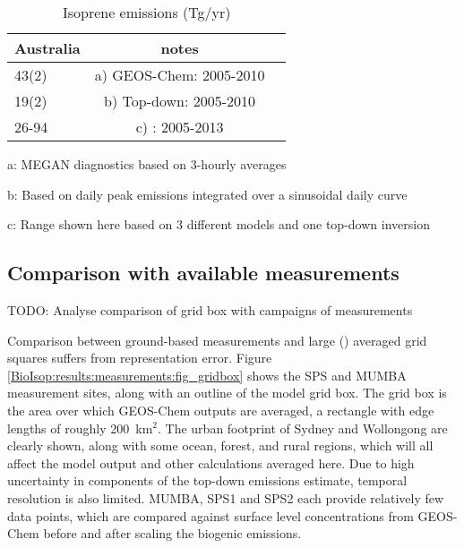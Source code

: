     
    
    \begin{table}\begin{threeparttable}
      \caption{Isoprene emissions (Tg/yr)}
      \begin{tabular}{ l  c  >{\arraybackslash}p{10cm} } 
        \toprule
        Australia & notes \\
        \midrule
        43(2) & a) GEOS-Chem: 2005-2010 \\ %
        19(2) & b) Top-down: 2005-2010 \\
        26-94 & c) \textcite{Bauwens2016}: 2005-2013\\
        \bottomrule
      \end{tabular}
      \begin{tablenotes} 
        \item a: MEGAN diagnostics based on 3-hourly averages
        \item b: Based on daily peak emissions integrated over a sinusoidal daily curve
        \item c: Range shown here based on 3 different models and one top-down inversion
      \end{tablenotes}
      \label{BioIsop:results:emissions:tab_emissions_Tg}
    \end{threeparttable}\end{table}
  
  \subsection{Comparison with available measurements}
    \label{BioIsop:results:measurements}
    TODO: %
    Analyse comparison of grid box with campaigns of measurements
    
    Comparison between ground-based measurements and large (\lowhr) averaged grid squares suffers from representation error.
    Figure \ref{BioIsop:results:measurements:fig_gridbox} shows the SPS and MUMBA measurement sites, along with an outline of the \lowhr model grid box.
    The grid box is the area over which GEOS-Chem outputs are averaged, a rectangle with edge lengths of roughly 200~km$^{2}$.
    The urban footprint of Sydney and Wollongong are clearly shown, along with some ocean, forest, and rural regions, which will all affect the model output and other calculations averaged here.
    Due to high uncertainty in components of the top-down emissions estimate, temporal resolution is also limited.
    MUMBA, SPS1 and SPS2 each provide relatively few data points, which are compared against surface level concentrations from GEOS-Chem before and after scaling the biogenic emissions.
    
